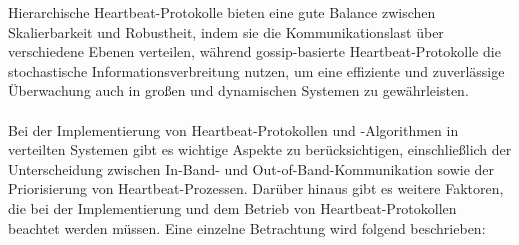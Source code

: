 \documentclass[../vs-script-first-v01.tex]{subfiles}
\begin{document}
Hierarchische Heartbeat-Protokolle bieten eine gute Balance zwischen Skalierbarkeit und Robustheit, indem sie die Kommunikationslast über verschiedene Ebenen verteilen, während gossip-basierte Heartbeat-Protokolle die stochastische Informationsverbreitung nutzen, um eine effiziente und zuverlässige Überwachung auch in großen und dynamischen Systemen zu gewährleisten.
\\\\
Bei der Implementierung von Heartbeat-Protokollen und -Algorithmen in verteilten Systemen gibt es wichtige Aspekte zu berücksichtigen, einschließlich der Unterscheidung zwischen In-Band- und Out-of-Band-Kommunikation sowie der Priorisierung von Heartbeat-Prozessen. Darüber hinaus gibt es weitere Faktoren, die bei der Implementierung und dem Betrieb von Heartbeat-Protokollen beachtet werden müssen. Eine einzelne Betrachtung wird folgend beschrieben:
\end{document}
